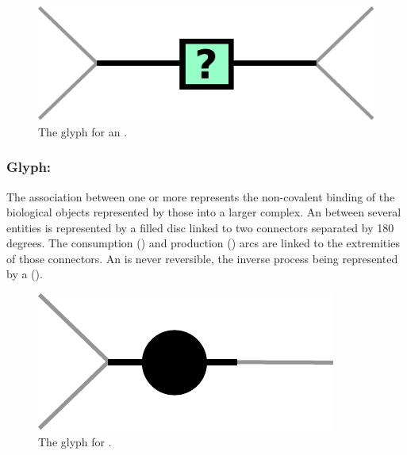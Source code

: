 \begin{figure}[htb]
  \centering
  \includegraphics[scale = 0.5]{le_images/uncertain}
  \caption{The \PD glyph for an .}
  \label{fig:uncertain}
\end{figure}


\subsubsection{Glyph: }\label{sec:association}

The association between one or more  represents the non-covalent binding of the biological objects represented by those  into a larger complex. An  between several entities is represented by a filled disc linked to two connectors separated by 180 degrees. The consumption () and production () arcs are linked to the extremities of those connectors. An  is never reversible, the inverse process being represented by a  ().

\begin{figure}[htb]
  \centering
  \includegraphics[scale = 0.5]{le_images/association}
  \caption{The \PD glyph for .}
  \label{fig:association}
\end{figure}

